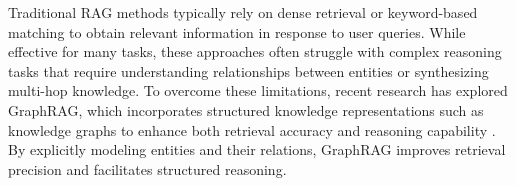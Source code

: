 \documentclass[11pt]{article}
\begin{document}
Traditional RAG methods typically rely on dense retrieval \citep{karpukhin2020dense} or keyword-based matching to obtain relevant information in response to user queries. While effective for many tasks, these approaches often struggle with complex reasoning tasks that require understanding relationships between entities or synthesizing multi-hop knowledge. To overcome these limitations, recent research has explored GraphRAG, which incorporates structured knowledge representations such as knowledge graphs to enhance both retrieval accuracy and reasoning capability \cite{guo2024lightragsimplefastretrievalaugmented, liang2024kagboostingllmsprofessional}. By explicitly modeling entities and their relations, GraphRAG improves retrieval precision and facilitates structured reasoning.


\end{document}
